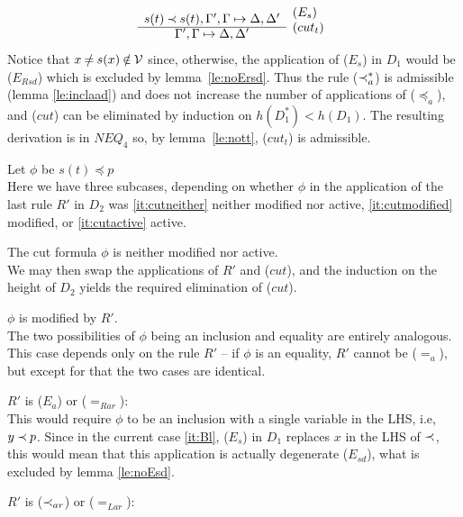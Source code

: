 \begin{PROOF}
\begin{LS}
\[\begin{array}{cl}
s(t)\Incl s(t), \Gamma',\GSD,\Delta' 
  & \raisebox{1.2ex}[1.5ex][0ex]{($E_s$)} \\ \cline{1-1}
\Gamma',\GSD,\Delta' 
& \raisebox{1.2ex}[1.5ex][0ex]{($cut_t$)} 
\end{array} 
 \]
\noindent
Notice that $x\not=s(x)\not\in\Vars$ since, otherwise, the application of 
($E_s$) in $D_1$ would be ($E_{Rsd}$) which is excluded by lemma~\ref{le:noErsd}.
Thus the rule ($\mathbin{\prec}_a^*$) is admissible (lemma \ref{le:inclaad}) and
does not increase the number of
applications of ($\preceq_a$), and ($cut$)
can be eliminated by induction on $h(D_1^*)<h(D_1)$.
The resulting derivation is  in $NEQ_4$ so, by lemma~\ref{le:nott},
($cut_t$) is admissible.
%
\item\label{it:Bl} Let $\phi$ be $s(t)\preceq p$ \\[.5ex]
\noindent
Here we have three subcases, depending on
whether $\phi$ in the application of the last rule $R'$ in $D_2$ was 
\ref{it:cutneither} neither modified nor active, \ref{it:cutmodified} modified, 
or \ref{it:cutactive} active.
%
\begin{LSA}
%
\item\label{it:cutneither} The cut formula $\phi$ is neither modified nor active.\\
We may then swap the
applications of $R'$ and ($cut$), and the induction on the height of $D_2$
yields the required elimination of ($cut$). 
%
\item\label{it:cutmodified}  $\phi$ is modified by $R'$.\\
The two possibilities of $\phi$ being an inclusion and equality are entirely 
analogous. This case depends only on the rule $R'$ -- if $\phi$ is an equality, 
$R'$ cannot be ($=_a$), but except for that the two cases are identical.
%
 \begin{LSB}
   \item $R'$ is ($E_a$) or ($=_{Rar}$): \\
  This would require $\phi$ to be an inclusion with  a single
   variable in the LHS, i.e, $y\mathbin{\prec} p$. %
Since in the current case \ref{it:Bl},
  ($E_s$) in $D_1$
   replaces $x$ in the LHS of $\mathbin{\prec}$, this would mean that this application is
   actually degenerate ($E_{sd}$), what is excluded by lemma \ref{le:noEsd}. 
  \item  $R'$ is ($\mathbin{\prec}_{ar}$) or ($=_{Lar}$): \\

\end{LSB}
\end{LSA}
\end{LS}
\end{PROOF}
